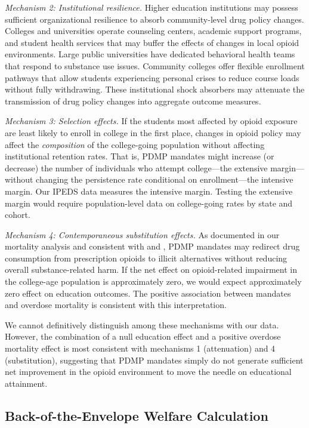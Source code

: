 \documentclass[12pt]{article}
\begin{document}
\textit{Mechanism 2: Institutional resilience.} Higher education institutions may possess sufficient organizational resilience to absorb community-level drug policy changes. Colleges and universities operate counseling centers, academic support programs, and student health services that may buffer the effects of changes in local opioid environments. Large public universities have dedicated behavioral health teams that respond to substance use issues. Community colleges offer flexible enrollment pathways that allow students experiencing personal crises to reduce course loads without fully withdrawing. These institutional shock absorbers may attenuate the transmission of drug policy changes into aggregate outcome measures.

\textit{Mechanism 3: Selection effects.} If the students most affected by opioid exposure are least likely to enroll in college in the first place, changes in opioid policy may affect the \textit{composition} of the college-going population without affecting institutional retention rates. That is, PDMP mandates might increase (or decrease) the number of individuals who attempt college---the extensive margin---without changing the persistence rate conditional on enrollment---the intensive margin. Our IPEDS data measures the intensive margin. Testing the extensive margin would require population-level data on college-going rates by state and cohort.

\textit{Mechanism 4: Contemporaneous substitution effects.} As documented in our mortality analysis and consistent with \citet{alpert2018supply} and \citet{evans2019opioid}, PDMP mandates may redirect drug consumption from prescription opioids to illicit alternatives without reducing overall substance-related harm. If the net effect on opioid-related impairment in the college-age population is approximately zero, we would expect approximately zero effect on education outcomes. The positive association between mandates and overdose mortality is consistent with this interpretation.

We cannot definitively distinguish among these mechanisms with our data. However, the combination of a null education effect and a positive overdose mortality effect is most consistent with mechanisms 1 (attenuation) and 4 (substitution), suggesting that PDMP mandates simply do not generate sufficient net improvement in the opioid environment to move the needle on educational attainment.

\subsection{Back-of-the-Envelope Welfare Calculation}
\end{document}

